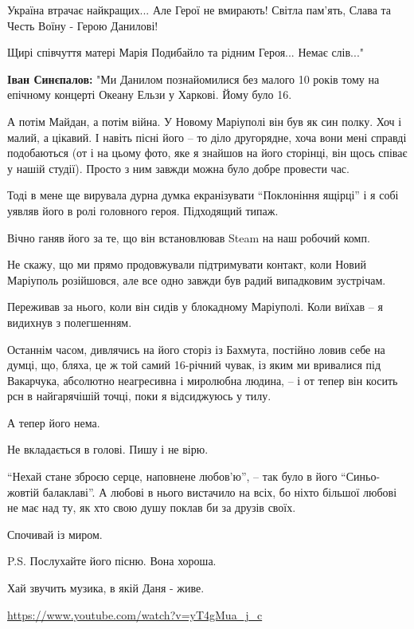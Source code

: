 Україна втрачає найкращих... Але Герої не вмирають! Світла пам'ять, Слава та
Честь Воїну - Герою Данилові! 

Щирі співчуття матері Марія Подибайло та рідним Героя... Немає слів..."

\textbf{Іван Синєпалов:} "Ми Данилом познайомилися без малого 10 років тому на
епічному концерті Океану Ельзи у Харкові. Йому було 16.

А потім Майдан, а потім війна. У Новому Маріуполі він був як син полку. Хоч і
малий, а цікавий. І навіть пісні його – то діло другорядне, хоча вони мені
справді подобаються (от і на цьому фото, яке я знайшов на його сторінці, він
щось співає у нашій студії). Просто з ним завжди можна було добре провести час.


Тоді в мене ще вирувала дурна думка екранізувати \enquote{Поклоніння ящірці} і я собі
уявляв його в ролі головного героя. Підходящий типаж.

Вічно ганяв його за те, що він встановлював Steam на наш робочий комп.

Не скажу, що ми прямо продовжували підтримувати контакт, коли Новий Маріуполь
розійшовся, але все одно завжди був радий випадковим зустрічам.

Переживав за нього, коли він сидів у блокадному Маріуполі. Коли виїхав – я
видихнув з полегшенням.

Останнім часом, дивлячись на його сторіз із Бахмута, постійно ловив себе на
думці, що, бляха, це ж той самий 16-річний чувак, із яким ми вривалися під
Вакарчука, абсолютно неагресивна і миролюбна людина, – і от тепер він косить
рсн в найгарячішій точці, поки я відсиджуюсь у тилу.

А тепер його нема.

Не вкладається в голові. Пишу і не вірю.

\enquote{Нехай стане зброєю серце, наповнене любов'ю}, – так було в його \enquote{Синьо-жовтій
балаклаві}. А любові в нього вистачило на всіх, бо ніхто більшої любові не має
над ту, як хто свою душу поклав би за друзів своїх.

Спочивай із миром.

P.S. Послухайте його пісню. Вона хороша. 

Хай звучить музика, в якій Даня  - живе. 

\url{https://www.youtube.com/watch?v=yT4gMua_j_c}

